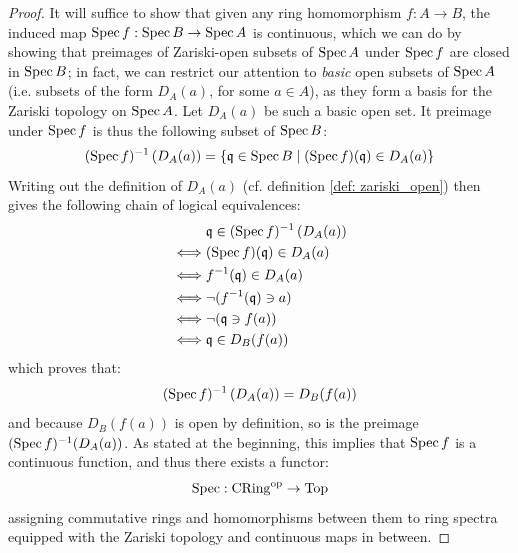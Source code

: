                 \begin{proof}
                    It will suffice to show that given any ring homomorphism $f: A \to B$, the induced map $\operatorname{Spec} f: \operatorname{Spec} B \to \operatorname{Spec} A$ is continuous, which we can do by showing that preimages of Zariski-open subsets of $\operatorname{Spec} A$ under $\operatorname{Spec} f$ are closed in $\operatorname{Spec} B$; in fact, we can restrict our attention to \textit{basic} open subsets of $\operatorname{Spec} A$ (i.e. subsets of the form $D_A(a)$, for some $a \in A$), as they form a basis for the Zariski topology on $\operatorname{Spec} A$. Let $D_A(a)$ be such a basic open set. It preimage under $\operatorname{Spec} f$ is thus the following subset of $\operatorname{Spec} B$:
                        $$(\operatorname{Spec} f)^{-1}\left(D_A(a)\right) = \{\mathfrak{q} \in \operatorname{Spec} B \mid (\operatorname{Spec} f)(\mathfrak{q}) \in D_A(a)\}$$
                    Writing out the definition of $D_A(a)$ (cf. definition \ref{def: zariski_open}) then gives the following chain of logical equivalences:
                        $$
                            \begin{aligned}
                                & \mathfrak{q} \in (\operatorname{Spec} f)^{-1}\left(D_A(a)\right)
                                \\
                                \iff & (\operatorname{Spec} f)(\mathfrak{q}) \in D_A(a)
                                \\
                                \iff & f^{-1}(\mathfrak{q}) \in D_A(a)
                                \\
                                \iff & \neg(f^{-1}(\mathfrak{q}) \ni a)
                                \\
                                \iff & \neg(\mathfrak{q} \ni f(a))
                                \\
                                \iff & \mathfrak{q} \in D_B(f(a))
                            \end{aligned}
                        $$
                    which proves that:
                        $$(\operatorname{Spec} f)^{-1}\left(D_A(a)\right) = D_B(f(a))$$
                    and because $D_B(f(a))$ is open by definition, so is the preimage $(\operatorname{Spec} f)^{-1}(D_A(a))$. As stated at the beginning, this implies that $\operatorname{Spec} f$ is a continuous function, and thus there exists a functor:
                        $$\operatorname{Spec}: \mathrm{CRing}^{\mathrm{op}} \to \mathrm{Top}$$
                    assigning commutative rings and homomorphisms between them to ring spectra equipped with the Zariski topology and continuous maps in between.
                \end{proof}
                
